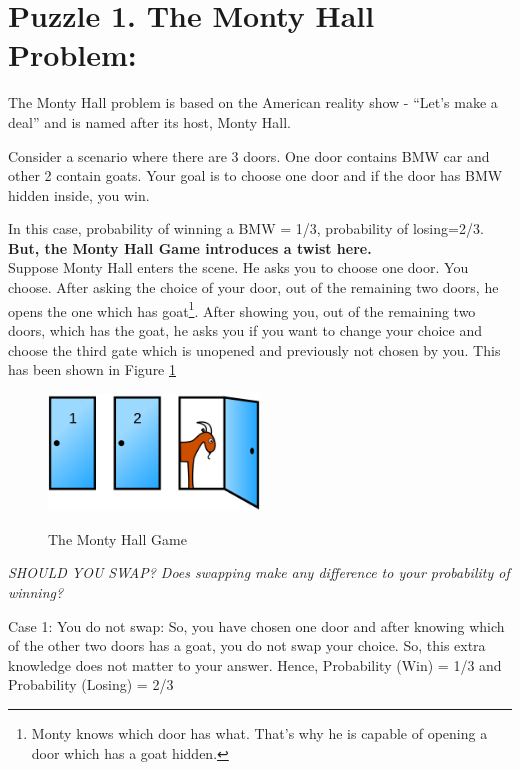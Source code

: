 \documentclass[a4paper]{article}
\begin{document}
\tableofcontents
\pagebreak


\section{ Puzzle 1. The Monty Hall Problem:}

The Monty Hall problem is based on the American reality show - ``Let's make a deal'' and is named after its host, Monty Hall. 

Consider a scenario where there are 3 doors. One door contains BMW car and other 2 contain goats. Your goal is to choose one door and if the door has BMW hidden inside, you win. 

In this case, probability of winning a BMW = 1/3, probability of losing=2/3.\\

\textbf{But, the Monty Hall Game introduces a twist here.}\\

Suppose Monty Hall enters the scene. He asks you to choose one door. You choose. After asking the choice of your door, out of the remaining two doors, he opens the one which has goat\footnote{Monty knows which door has what. That's why he is capable of opening a door which has a goat hidden.}. After showing you, out of the remaining two doors, which has the goat, he asks you if you want to change your choice and choose the third gate which is unopened and previously not chosen by you. This has been shown in Figure \ref{monty} \\

\begin{figure}[h]
\centering
\includegraphics[width=0.5\textwidth]{monty.png}
\label{monty}
\caption{The Monty Hall Game}
\end{figure}

\textit{SHOULD YOU SWAP? Does swapping make any difference to your probability of winning? }

Case 1: You do not swap: So, you have chosen one door and after knowing which of the other two doors has a goat, you do not swap your choice. So, this extra knowledge does not matter to your answer.
Hence, Probability (Win) = 1/3 and Probability (Losing) = 2/3
\end{document}
